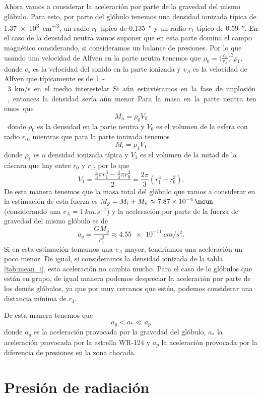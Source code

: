 \documentclass{book}
\begin{document}
Ahora vamos a considerar la aceleración por parte de la gravedad del mismo glóbulo. Para esto, por parte del glóbulo tenemos una densidad ionizada típica de \SI{1.37e3}{cm^{-3}}, un radio $r_0$ típico de \SI{.135}{\arcsecond} y un radio $r_1$ típico de \SI{.59}{\arcsecond}. En el caso de la densidad neutra vamos suponer que en esta parte domina el campo magnético considerando, si consideramos un balance de presiones. Por lo que usando una velocidad de Alfven en la parte neutra tenemos que $\rho_0 = \Big(\frac{c_s}{v_A}\Big)^2\rho_1$, donde $c_s$ es la velocidad del sonido en la parte ionizada y $v_A$ es la velocidad de Alfven que típicamente es de \SI{1}-\SI{3}{km/s} en el medio interestelar. Si aún estuviéramos en la fase de implosión, entonces la densidad sería aún menor. Para la masa en la parte neutra tenemos que \[M_n = \rho_0 V_0\]
donde $\rho_0$ es la densidad en la parte neutra y $V_0$ es el volumen de la esfera con radio $r_0$, mientras que para la parte ionizada tenemos \[M_i = \rho_1 V_1\] donde $\rho_1$ es a densidad ionizada típica  y $V_1$ es el volumen de la mitad de la cáscara que hay entre $r_0$ y $r_1$, por lo que \[V_1 = \frac{\frac{4}{3}\pi r_1^3-\frac{4}{3}\pi r_0^3}{2}=\frac{2\pi}{3}(r_1^3-r_0^3).\] De esta manera tenemos que la masa total del glóbulo que vamos a considerar en la estimación de esta fuerza es $M_g = M_i + M_n \approx \SI{7.87e-4}{\msun}$ (considerando una $v_A=\SI{1}{km.s^{-1}}$) y la aceleración por parte de la fuerza de gravedad del mismo glóbulo es de
\[a_g=\frac{G M_g}{r_1^2}\approx \SI{4.55e-11}{cm/s^2}.\] Si en esta estimación tomamos una $v_A$ mayor, tendríamos una aceleración un poco menor. De igual, si consideramos la densidad ionizada de la tabla \ref{tab:mean_i}, esta aceleración no cambia mucho. Para el caso de lo glóbulos que están en grupo, de igual manera podemos despreciar la aceleración por parte de los demás glóbulos, ya que por muy cercanos que estén, podemos considerar una distancia mínima de $r_1$. 

De esta manera tenemos que
\[a_g<a_*\ll a_p\]
donde $a_g$ es la aceleración provocada por la gravedad del glóbulo, $a_*$ la aceleración provocada por la estrella WR-124 y $a_p$ la aceleración provocada por la diferencia de presiones en la zona chocada.

\section{Presión de radiación}
\end{document}
